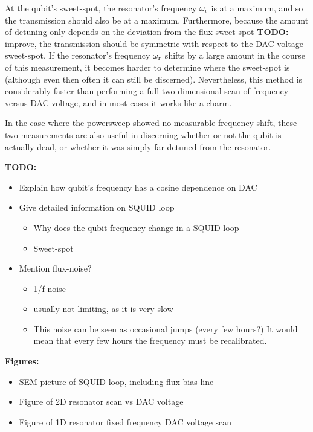         At the qubit's sweet-spot, the resonator's frequency $\omega_\text{r}$ is at a maximum, and so the transmission should also be at a maximum. Furthermore, because the amount of detuning only depends on the deviation from the flux sweet-spot \textbf{TODO:} improve, the transmission should be symmetric with respect to the DAC voltage sweet-spot. If the resonator's frequency $\omega_\text{r}$ shifts by a large amount in the course of this measurement, it becomes harder to determine where the sweet-spot is (although even then often it can still be discerned). Nevertheless, this method is considerably faster than performing a full two-dimensional scan of frequency versus DAC voltage, and in most cases it works like a charm.

        In the case where the powersweep showed no measurable frequency shift, these two measurements are also useful in discerning whether or not the qubit is actually dead, or whether it was simply far detuned from the resonator.


        \textbf{TODO:}
        \begin{itemize}
          \item Explain how qubit's frequency has a cosine dependence on DAC
          \item Give detailed information on SQUID loop
          \begin{itemize}
            \item Why does the qubit frequency change in a SQUID loop
            \item Sweet-spot
          \end{itemize}
          \item Mention flux-noise?
          \begin{itemize}
            \item 1/f noise
            \item usually not limiting, as it is very slow
            \item This noise can be seen as occasional jumps (every few hours?) It would mean that every few hours the frequency must be recalibrated.
          \end{itemize}
        \end{itemize}

        \textbf{Figures:}
        \begin{itemize}
          \item SEM picture of SQUID loop, including flux-bias line
          \item Figure of 2D resonator scan vs DAC voltage
          \item Figure of 1D resonator fixed frequency DAC voltage scan
        \end{itemize}

